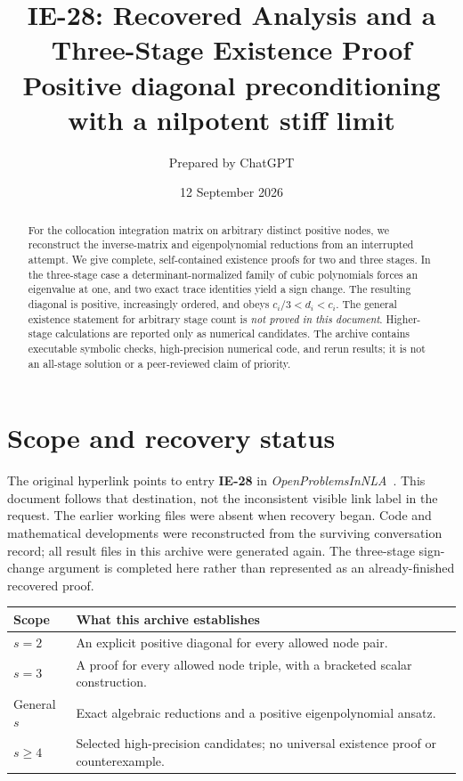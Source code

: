 \documentclass[11pt]{article}
\title{\textbf{IE-28: Recovered Analysis and a\\Three-Stage Existence Proof}\\[6pt]
\large Positive diagonal preconditioning with a nilpotent stiff limit}
\author{Prepared by ChatGPT}
\date{12 September 2026}
\theoremstyle{remark}
\begin{document}
\maketitle
\thispagestyle{empty}

\begin{abstract}
For the collocation integration matrix on arbitrary distinct positive nodes, we
reconstruct the inverse-matrix and eigenpolynomial reductions from an interrupted
attempt. We give complete, self-contained existence proofs for two and three
stages. In the three-stage case a determinant-normalized family of cubic
polynomials forces an eigenvalue at one, and two exact trace identities yield a
sign change. The resulting diagonal is positive, increasingly ordered, and obeys
$c_i/3<d_i<c_i$. The general existence statement for arbitrary stage count is
\emph{not proved in this document}. Higher-stage calculations are reported only
as numerical candidates. The archive contains executable symbolic checks,
high-precision numerical code, and rerun results; it is not an all-stage solution
or a peer-reviewed claim of priority.
\end{abstract}

\section*{Scope and recovery status}
The original hyperlink points to entry \textbf{IE-28} in
\emph{OpenProblemsInNLA}~\cite{entry}. This document follows that destination,
not the inconsistent visible link label in the request. The earlier working
files were absent when recovery began. Code and mathematical developments were
reconstructed from the surviving conversation record; all result files in this
archive were generated again. The three-stage sign-change argument is completed
here rather than represented as an already-finished recovered proof.

\begin{center}
\begin{tabular}{@{}p{}p{}@{}}
\toprule
Scope & What this archive establishes \\
\midrule
$s=2$ & An explicit positive diagonal for every allowed node pair. \\
$s=3$ & A proof for every allowed node triple, with a bracketed scalar construction. \\
General $s$ & Exact algebraic reductions and a positive eigenpolynomial ansatz. \\
$s\geq4$ & Selected high-precision candidates; no universal existence proof or counterexample. \\
\bottomrule
\end{tabular}
\end{center}
\end{document}
